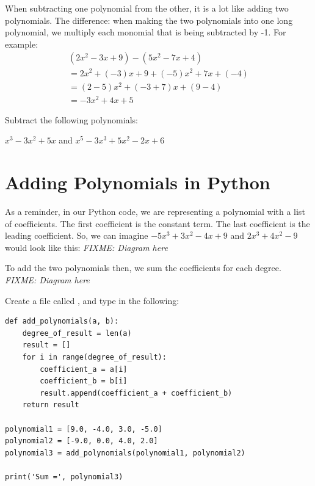 When subtracting one polynomial from the other, it is a lot like
adding two polynomials. The difference: when making the two polynomials
into one long polynomial, we multiply each monomial that is being
subtracted by -1. For example:
\begin{multline*}
  (2x^2 - 3x + 9) - (5x^2 - 7x + 4) \\
  = 2x^2 + (-3)x + 9 + (-5)x^2 + 7x + (-4) \\
  = (2 - 5)x^2 + (-3 + 7)x + (9-4) \\
  = -3x^2 + 4x + 5
\end{multline*}

\begin{Exercise}[title=Subtracting Polynomials Practice, label=subtractpns]
  Subtract the following polynomials:
  \vspace{20mm}
  \vspace{20mm}
\end{Exercise}
\begin{Answer}[ref=subtractpns]$x^3 - 3x^2 + 5x$ and $x^5 - 3x^3 + 5x^2 - 2x + 6$\end{Answer}

\section{Adding Polynomials in Python}

As a reminder, in our Python code, we are representing a polynomial
with a list of coefficients.  The first coefficient is the constant
term. The last coefficient is the leading coefficient. So, we can
imagine $-5x^3 + 3x^2 - 4x + 9$ and $2x^3 +4x^2 - 9$ would look
like this: \textit{FIXME: Diagram here}

To add the two polynomials then, we sum the coefficients for each degree.
\textit{FIXME: Diagram here}

Create a file called , and type in the following: 
\begin{verbatim}
def add_polynomials(a, b):
    degree_of_result = len(a)
    result = []
    for i in range(degree_of_result):
        coefficient_a = a[i]
        coefficient_b = b[i]
        result.append(coefficient_a + coefficient_b)
    return result

polynomial1 = [9.0, -4.0, 3.0, -5.0]
polynomial2 = [-9.0, 0.0, 4.0, 2.0]
polynomial3 = add_polynomials(polynomial1, polynomial2)

print('Sum =', polynomial3)
\end{verbatim}

